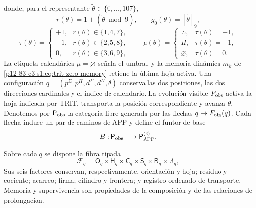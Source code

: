 donde, para el representante
\(\widetilde\theta\in\{0,\ldots,107\}\),
\[
r(\theta)=1+(\widetilde\theta\bmod9),
\qquad g_0(\theta)=[\widetilde\theta]_9,
\]
\[
\tau(\theta)=
\begin{cases}
+1,&r(\theta)\in\{1,4,7\},\\
-1,&r(\theta)\in\{2,5,8\},\\
0,&r(\theta)\in\{3,6,9\},
\end{cases}
\qquad
\mu(\theta)=
\begin{cases}
\Sigma,&\tau(\theta)=+1,\\
\Pi,&\tau(\theta)=-1,\\
\varnothing,&\tau(\theta)=0.
\end{cases}
\]
La etiqueta calendárica \(\mu=\varnothing\) señala el umbral, y la memoria
dinámica \(m_k\) de \eqref{p12-83-c3-s1:eq:trit-zero-memory} retiene la última hoja
activa. Una configuración
\(q=(p^\Sigma,p^\Pi,d^\Sigma,d^\Pi,\theta)\) conserva las dos posiciones,
las dos direcciones cardinales y el índice de calendario. La evolución
visible \(F_{\rm obs}\) activa la hoja indicada por TRIT, transporta la
posición correspondiente y avanza \(\theta\). Denotemos por
\(\mathsf P_{\rm obs}\) la categoría libre generada por las flechas
\(q\to F_{\rm obs}(q)\). Cada flecha induce un par de caminos de APP y
define el funtor de base
\begin{equation}
B:\mathsf P_{\rm obs}\longrightarrow\mathsf P_{\rm APP}^{(2)}.
\label{p12-83-c3-s1:eq:tpk-bivariant-base-functor}
\end{equation}

Sobre cada \(q\) se dispone la fibra tipada
\begin{equation}
\mathcal F_q=
\mathsf O_q\times\mathsf H_q\times\mathsf C_q\times\mathsf S_q
\times\mathsf B_q\times\mathsf\Lambda_q,
\label{p12-83-c3-s1:eq:tpk-fiber}
\end{equation}
Sus seis factores conservan, respectivamente, orientación y hoja; residuo y
cociente; acarreo; firma; cilindro y frontera; y registro ordenado de
transporte. Memoria y supervivencia son propiedades de la composición y de
las relaciones de prolongación.

